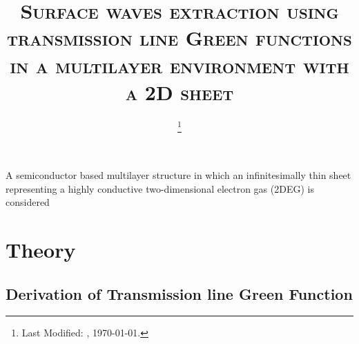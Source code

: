 \documentclass[12pt]{article}
\begin{document}
\title{\textsc{Surface waves extraction using transmission line Green functions in a multilayer environment with a 2D sheet}}

\date{\footnote{Last Modified: \currenttime, \today.}}

\maketitle





A semiconductor based multilayer structure in which an infinitesimally thin sheet representing a highly conductive two-dimensional electron gas (2DEG) is considered

\section{Theory}
\subsection{Derivation of Transmission line Green Function}
\end{document}
